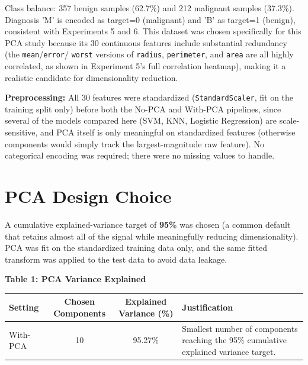 \documentclass[12pt,a4paper]{article}
\newenvironment{fitwidth}
  {\begin{lrbox}{\fitbox}}
  {\end{lrbox}\ifdim\wd\fitbox>\linewidth\resizebox{\linewidth}{!}{\usebox{\fitbox}}\else\usebox{\fitbox}\fi}
\DeclareRobustCommand{\_}{\textunderscore\allowbreak}
\begin{document}
Class balance: 357 benign samples (62.7\%) and 212 malignant samples
(37.3\%). Diagnosis 'M' is encoded as target=0 (malignant) and 'B' as
target=1 (benign), consistent with Experiments 5 and 6. This dataset was
chosen specifically for this PCA study because its 30 continuous features
include substantial redundancy (the \texttt{mean}/\texttt{error}/
\texttt{worst} versions of \texttt{radius}, \texttt{perimeter}, and
\texttt{area} are all highly correlated, as shown in Experiment 5's full
correlation heatmap), making it a realistic candidate for dimensionality
reduction.

\textbf{Preprocessing:} All 30 features were standardized
(\texttt{StandardScaler}, fit on the training split only) before both the
No-PCA and With-PCA pipelines, since several of the models compared here
(SVM, KNN, Logistic Regression) are scale-sensitive, and PCA itself is only
meaningful on standardized features (otherwise components would simply
track the largest-magnitude raw feature). No categorical encoding was
required; there were no missing values to handle.

\section{PCA Design Choice}

A cumulative explained-variance target of \textbf{95\%} was chosen (a
common default that retains almost all of the signal while meaningfully
reducing dimensionality). PCA was fit on the standardized training data
only, and the same fitted transform was applied to the test data to avoid
data leakage.

\begin{center}
\begin{minipage}{\linewidth}\centering
\textbf{Table 1: PCA Variance Explained}\par\smallskip
\begin{fitwidth}
\begin{tabular}{lcc>{\raggedright\arraybackslash}p{4.2cm}}
\toprule
Setting & Chosen Components & Explained Variance (\%) & Justification \\
\midrule
With-PCA & 10 & 95.27\% & Smallest number of components reaching the 95\% cumulative explained variance target. \\
\bottomrule
\end{tabular}
\end{fitwidth}
\end{minipage}
\end{center}
\end{document}
